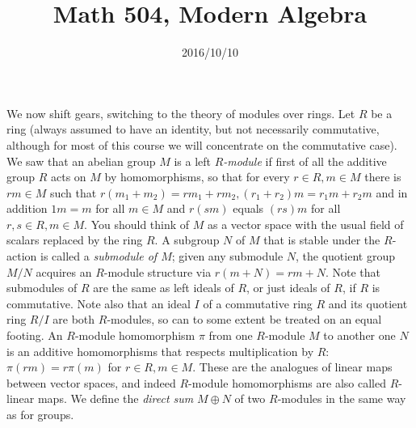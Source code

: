 \documentclass[10pt]{article}
\title{Math 504, Modern Algebra}
\date{2016/10/10}
\begin{document}
\maketitle

We now shift gears, switching to the theory of modules over rings. Let
$R$ be a ring (always assumed to have an identity, but not necessarily
commutative, although for most of this course we will concentrate on the
commutative case). We saw that an abelian group $M$ is a left {\sl
  $R$-module} if first of all the additive group $R$ acts on $M$ by
homomorphisms, so that for every $r\in R, m\in M$ there is $rm\in M$
such that $r(m_1+m_2) = rm_1 + rm_2, (r_1+r_2)m = r_1 m + r_2 m$ and in
addition $1 m = m$ for all $m\in M$ and $r(sm)$ equals $(rs)m$ for all
$r,s\in R,m\in M$. You should think of $M$ as a vector space with the
usual field of scalars replaced by the ring $R$. A subgroup $N$ of $M$
that is stable under the $R$-action is called a {\sl submodule of $M$};
given any submodule $N$, the quotient group $M/N$ acquires an $R$-module
structure via $r(m+N) = rm + N$. Note that submodules of $R$ are the
same as left ideals of $R$, or just ideals of $R$, if $R$ is
commutative. Note also that an ideal $I$ of a commutative ring $R$ and
its quotient ring $R/I$ are both $R$-modules, so can to some extent be
treated on an equal footing. An $R$-module homomorphism $\pi$ from one
$R$-module $M$ to another one $N$ is an additive homomorphisms that
respects multiplication by $R$: $\pi(rm) = r\pi(m)$ for $r\in R,m\in M$.
These are the analogues of linear maps between vector spaces, and indeed
$R$-module homomorphisms are also called $R$-linear maps. We define the
{\sl direct sum} $M\oplus N$ of two $R$-modules in the same way as for
groups.
\end{document}
